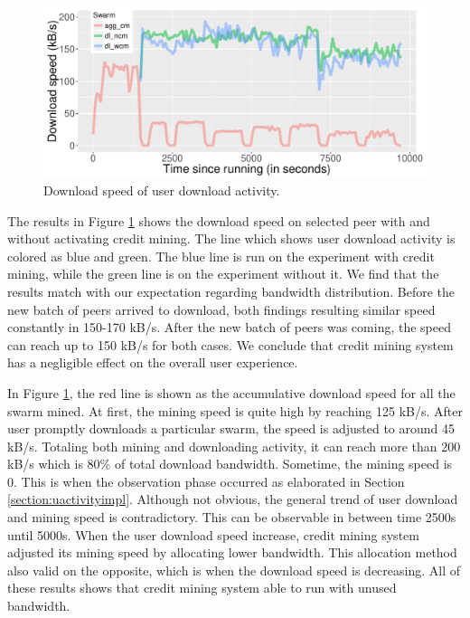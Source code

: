 \begin{figure}[h!]
		\centering
		\includegraphics[width=\textwidth]{pics/results/pr_g2-act2.pdf}
		\caption{Download speed of user download activity.}
		\label{fig:cmprio}
\end{figure}

The results in Figure \ref{fig:cmprio} shows the download speed on selected peer with and without activating credit mining. The line which shows user download activity is colored as blue and green. The blue line is run on the experiment with credit mining, while the green line is on the experiment without it. We find that the results match with our expectation regarding bandwidth distribution. Before the new batch of peers arrived to download, both findings resulting similar speed constantly in 150-170 kB/s. After the new batch of peers was coming, the speed can reach up to 150 kB/s for both cases. We conclude that credit mining system has a negligible effect on the overall user experience. 

In Figure \ref{fig:cmprio}, the red line is shown as the accumulative download speed for all the swarm mined. At first, the mining speed is quite high by reaching 125 kB/s. After user promptly downloads a particular swarm, the speed is adjusted to around 45 kB/s. Totaling both mining and downloading activity, it can reach more than 200 kB/s which is 80\% of total download bandwidth. Sometime, the mining speed is 0. This is when the observation phase occurred as elaborated in Section \ref{section:uactivityimpl}. Although not obvious, the general trend of user download and mining speed is contradictory. This can be observable in between time 2500s until 5000s. When the user download speed increase, credit mining system adjusted its mining speed by allocating lower bandwidth. This allocation method also valid on the opposite, which is when the download speed is decreasing. All of these results shows that credit mining system able to run with unused bandwidth. 

